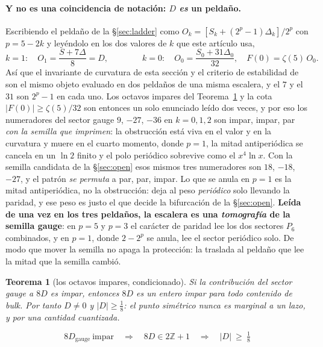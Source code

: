 \documentclass[11pt,a4paper]{article}
\newtheorem{theorem}{Teorema}
\newcommand{\ZZ}{\mathbb{Z}}
\newenvironment{keyeq}
  {\begin{center}\setlength{\fboxsep}{9pt}\setlength{\fboxrule}{0.8pt}%
   \begin{lrbox}{\keyeqbox}\begin{minipage}{0.88\textwidth}}
  {\end{minipage}\end{lrbox}%
   \fcolorbox{hdrblue!55}{hdrblue!6}{\usebox{\keyeqbox}}\end{center}}
\begin{document}
\paragraph{Y no es una coincidencia de notación: $D$ \emph{es} un peldaño.} Escribiendo el peldaño
de la \S\ref{sec:ladder} como $O_k=[S_k+(2^p-1)\Delta_k]/2^p$ con $p=5-2k$ y leyéndolo en los dos
valores de $k$ que este artículo usa,
\[
  k=1:\quad O_1=\frac{S+7\Delta}{8}=D,
  \qquad\qquad
  k=0:\quad O_0=\frac{S_0+31\Delta_0}{32},\quad F(0)=\zeta(5)\,O_0 .
\]
Así que el invariante de curvatura de esta sección y el criterio de estabilidad de \cite{CCD24} son
el mismo objeto evaluado en dos peldaños de una misma escalera, y el $7$ y el $31$ son $2^p-1$ en
cada uno. Los octavos impares del Teorema~\ref{thm:eighths} y la cota $|F(0)|\ge\zeta(5)/32$ son
entonces un solo enunciado leído dos veces, y por eso los numeradores del sector gauge $9$, $-27$,
$-36$ en $k=0,1,2$ son impar, impar, par \emph{con la semilla que \cite{KM25} imprimen}: la
obstrucción está viva en el valor y en la curvatura y
muere en el cuarto momento, donde $p=1$, la mitad antiperiódica se cancela en un $\ln2$ finito y el
polo periódico sobrevive como el $x^4\ln x$. Con la semilla candidata de la \S\ref{sec:open} esos mismos tres
numeradores son $18$, $-18$, $-27$, y el patrón \emph{se permuta} a par, par, impar. Lo que se
anula en $p=1$ es la mitad antiperiódica, no la obstrucción: deja al peso \emph{periódico} solo
llevando la paridad, y ese peso es justo el que decide la bifurcación de la \S\ref{sec:open}.
\textbf{Leída de una vez en los tres peldaños, la escalera es una \emph{tomografía} de la semilla
gauge}: en $p=5$ y $p=3$ el carácter de paridad lee los dos sectores $P_6$ combinados, y en $p=1$,
donde $2-2^{p}$ se anula, lee el sector periódico solo. De modo que mover la semilla no apaga la
protección: la traslada al peldaño que lee la mitad que la semilla cambió.

\begin{theorem}[los octavos impares, condicionado]\label{thm:eighths}
\emph{Si} la contribución del sector gauge a $8D$ es impar, entonces $8D$ es un entero impar para
todo contenido de bulk. Por tanto $D\neq0$ y $|D|\ge\tfrac18$: \emph{el punto simétrico} nunca es
marginal a un lazo, y por una cantidad cuantizada.
\end{theorem}
\begin{keyeq}
\begin{equation}\label{eq:oddeighths}
  8D_{\mathrm{gauge}}\ \text{impar}
  \quad\Longrightarrow\quad 8D\in2\ZZ+1
  \quad\Longrightarrow\quad |D|\ \ge\ \tfrac18
\end{equation}
\end{keyeq}
\end{document}
